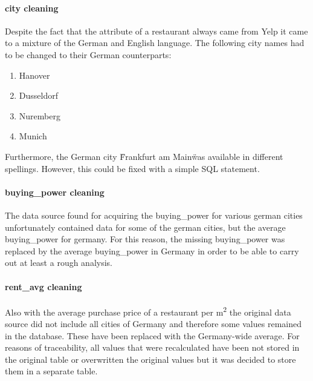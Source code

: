 \paragraph{city cleaning}
Despite the fact that the  attribute of a restaurant always came from Yelp it came to a mixture of the German and English language.
The following city names had to be changed to their German counterparts:
\begin{enumerate}
  \item Hanover
  \item Dusseldorf
  \item Nuremberg
  \item Munich
\end{enumerate}
Furthermore, the German city \"Frankfurt am Main\" was available in different spellings.
However, this could be fixed with a simple \ac{SQL} statement.
\paragraph{buying\_power cleaning}
The data source found for acquiring the buying\_power for various german cities unfortunately contained data for some of the german cities,
but the average buying\_power for germany.
For this reason, the missing buying\_power was replaced by the average buying\_power in Germany in order to be able to carry out at least a rough analysis.
\paragraph{rent\_avg cleaning}
Also with the average purchase price of a restaurant per m\textsuperscript{2} the original data source did not include all cities of Germany and therefore
some  values remained in the database.
These have been replaced with the Germany-wide average.
\newline
For reasons of traceability, all values that were recalculated have been
not stored in the original table or overwritten the original values
but it was decided to store them in a separate table.
